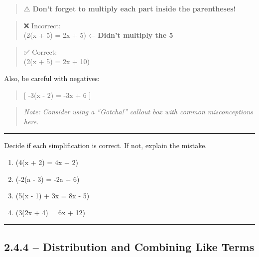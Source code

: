 \documentclass[
  letterpaper,
  DIV=11,
  numbers=noendperiod]{scrreprt}
\providecommand{\tightlist}{%
  \setlength{\itemsep}{0pt}\setlength{\parskip}{0pt}}
\begin{document}
\begin{quote}
⚠️ \textbf{Don't forget to multiply each part inside the parentheses!}
\end{quote}

\begin{quote}
❌ Incorrect:\\
(2(x + 5) = 2x + 5) ← \textbf{Didn't multiply the 5}
\end{quote}

\begin{quote}
✅ Correct:\\
(2(x + 5) = 2x + 10)
\end{quote}

Also, be careful with negatives:

\begin{quote}
{[} -3(x - 2) = -3x + 6 {]}
\end{quote}

\begin{quote}
\emph{Note: Consider using a ``Gotcha!'' callout box with common
misconceptions here.}
\end{quote}

\begin{center}\rule{0.5\linewidth}{0.5pt}\end{center}

Decide if each simplification is correct. If not, explain the mistake.

\begin{enumerate}
\def\labelenumi{\arabic{enumi}.}
\tightlist
\item
  (4(x + 2) = 4x + 2)\\
\item
  (-2(a - 3) = -2a + 6)\\
\item
  (5(x - 1) + 3x = 8x - 5)\\
\item
  (3(2x + 4) = 6x + 12)
\end{enumerate}

\begin{center}\rule{0.5\linewidth}{0.5pt}\end{center}

\subsection*{2.4.4 -- Distribution and Combining Like
Terms}\label{distribution-and-combining-like-terms}
\end{document}
